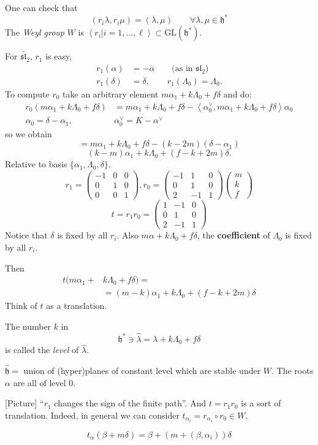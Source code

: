 One can check that
$$
(r_i\lambda,r_i\mu)=(\lambda,\mu)\qquad \forall \lambda,\mu \in \mathfrak{h}^*
$$
The {\it Weyl group} $W$ is $\left<r_i|i=1,\ldots,\ell\right>\subset 
\text{GL}(\mathfrak{h}^*)$.

\begin{example}
\label{example-Weyl-group-sl2tilde}
For $\tilde{\mathfrak{sl}_2}$, $r_1$ is easy,
\begin{align*}
r_1(\alpha)&=-\alpha \qquad \text{(as in $\mathfrak{sl}_2$)}\\
r_1(\delta)&=\delta,\qquad r_1(\Lambda_0)=\Lambda_0.
\end{align*}
To compute $r_0$ take an arbitrary element $m \alpha_1+k\Lambda_0+f\delta$ and
do:
\begin{align*}
r_0(m \alpha_1+k\Lambda_0+f\delta)&=m\alpha_1+k\Lambda_0+f\delta
-\left<\alpha_0^\vee,m\alpha_1+k\Lambda_0+f\delta\right>\alpha_0\\
\alpha_0=\delta-\alpha_1,\qquad & \alpha_0^\vee=K-\alpha^\vee
\end{align*}
so we obtain
$$
=m\alpha_1+k\Lambda_0+f\delta-(k-2m)(\delta-\alpha_1)
$$
$$
(k-m)\alpha_1+k\Lambda_0+(f-k+2m)\delta.
$$
Relative to basis $\{\alpha_1,\Lambda_0,\delta\}$.
$$
r_1=\begin{pmatrix}
-1&0&0\\
0&1&0\\
0&0&1
\end{pmatrix},
r_0=\begin{pmatrix}
-1&1&0\\
0&1&0\\
2&-1&1
\end{pmatrix}
\begin{pmatrix}
m\\
k\\
f
\end{pmatrix}
$$
$$
t=r_1r_0=\begin{pmatrix}
1&-1&0\\
0&1&0\\
2&-1&1
\end{pmatrix}
$$
Notice that $\delta$ is fixed by all $r_i$. Also 
$m \alpha+k \Lambda_0 +f\delta$, the {\bf coefficient} of $\Lambda_0$ is fixed
by all $r_i$.

Then
\begin{align*}
t(m\alpha_1+&k\Lambda_0+f\delta)=\\
&=(m-k)\alpha_1+k\Lambda_0+(f-k+2m)\delta
\end{align*}
Think of $t$ as a translation.

The number $k$ in 
 $$
\mathfrak{h}^* \ni \hat{\lambda}=\lambda+k\Lambda_0+f\delta
$$
is called the {\it level} of $\hat{\lambda}$.

$\hat{\mathfrak{h}}=$ union of (hyper)planes of constant level which are stable
under $W$. The roots $\alpha$ are all of level $0$.

[Picture] 
``$r_1$ changes the sign of the finite path''. And $t=r_1r_0$ is a sort of
translation. Indeed, in general we can consider 
$t_{\alpha_i}=r_{\alpha_i}\circ r_0 \in W$,

$$
t_\alpha(\beta+m\delta)=\beta+(m+(\beta,\alpha_i))\delta
$$
\end{example}
